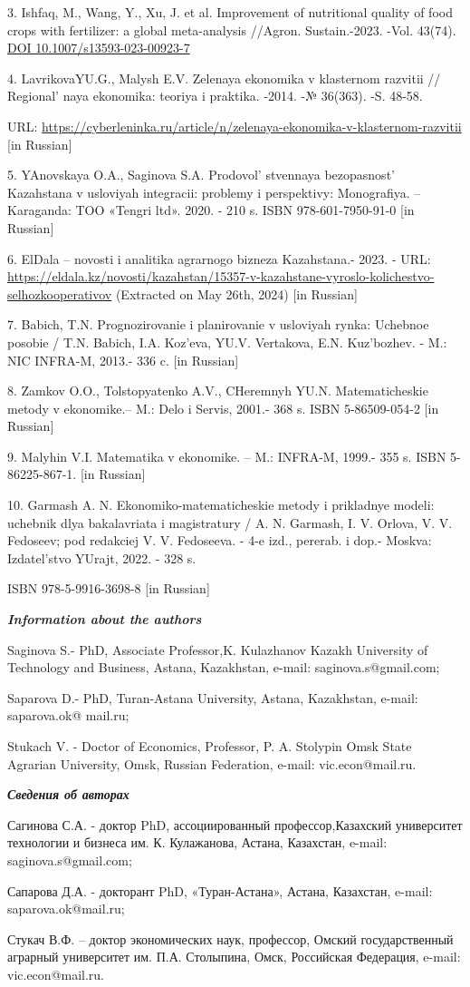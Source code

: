 3. Ishfaq, M., Wang, Y., Xu, J. et al. Improvement of nutritional
quality of food crops with fertilizer: a global meta-analysis //Agron.
Sustain.-2023. -Vol. 43(74).
\href{https://doi.org/10.1007/s13593-023-00923-7}{DOI
10.1007/s13593-023-00923-7}

4. LavrikovaYU.G., Malysh E.V. Zelenaya ekonomika v klasternom razvitii
// Regional' naya ekonomika: teoriya i praktika. -2014.
-№ 36(363). -S. 48-58.

URL:
\url{https://cyberleninka.ru/article/n/zelenaya-ekonomika-v-klasternom-razvitii}
{[}in Russian{]}

5. YAnovskaya O.A., Saginova S.A. Prodovol' stvennaya
bezopasnost' Kazahstana v usloviyah integracii: problemy i perspektivy:
Monografiya. -- Karaganda: TOO «Tengri ltd». 2020. - 210 s. ISBN
978-601-7950-91-0 {[}in Russian{]}

6. ElDala -- novosti i analitika agrarnogo bizneza Kazahstana.- 2023. -
URL:
\url{https://eldala.kz/novosti/kazahstan/15357-v-kazahstane-vyroslo-kolichestvo-selhozkooperativov}
(Extracted on May 26th, 2024) {[}in Russian{]}

7. Babich, T.N. Prognozirovanie i planirovanie v usloviyah rynka:
Uchebnoe posobie / T.N. Babich, I.A. Koz'eva, YU.V. Vertakova, E.N.
Kuz'bozhev. - M.: NIC INFRA-M, 2013.- 336 c. {[}in Russian{]}

8. Zamkov O.O., Tolstopyatenko A.V., CHeremnyh YU.N. Matematicheskie
metody v ekonomike.-- M.: Delo i Servis, 2001.- 368 s. ISBN
5-86509-054-2 {[}in Russian{]}

9. Malyhin V.I. Matematika v ekonomike. -- M.: INFRA-M, 1999.- 355 s.
ISBN 5-86225-867-1. {[}in Russian{]}

10. Garmash A. N. Ekonomiko-matematicheskie metody i prikladnye modeli:
uchebnik dlya bakalavriata i magistratury / A. N. Garmash, I. V. Orlova,
V. V. Fedoseev; pod redakciej V. V. Fedoseeva. - 4-e izd., pererab. i
dop.- Moskva: Izdatel'stvo YUrajt, 2022. - 328 s.

ISBN 978-5-9916-3698-8 {[}in Russian{]}

\emph{{\bfseries Information about the authors}}

Saginova S.- PhD, Associate Professor,K. Kulazhanov Kazakh University of
Technology and Business, Astana, Kazakhstan, e-mail:
saginova.s@gmail.com;

Saparova D.- PhD, Turan-Astana University, Astana, Kazakhstan, e-mail:
saparova.ok@ mail.ru;

Stukach V. - Doctor of Economics, Professor, P. A. Stolypin Omsk State
Agrarian University, Omsk, Russian Federation, e-mail: vic.econ@mail.ru.

\emph{{\bfseries Сведения об авторах}}

Сагинова С.А. - доктор PhD, ассоциированный профессор,Казахский
университет технологии и бизнеса им. К. Кулажанова, Астана, Казахстан,
e-mail: saginova.s@gmail.com;

Сапарова Д.А. - докторант PhD, «Туран-Астана», Астана, Казахстан,
e-mail: saparova.ok@mail.ru;

Стукач В.Ф. -- доктор экономических наук, профессор, Омский
государственный аграрный университет им. П.А. Столыпина, Омск,
Российская Федерация, e-mail: vic.econ@mail.ru.